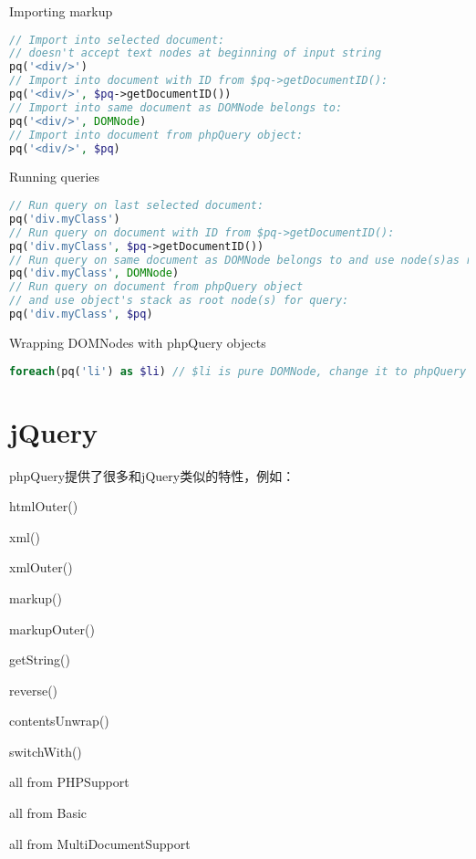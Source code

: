 \begin{compactenum}
\item Importing markup

\begin{lstlisting}[language=PHP]
// Import into selected document: 
// doesn't accept text nodes at beginning of input string 
pq('<div/>') 
// Import into document with ID from $pq->getDocumentID(): 
pq('<div/>', $pq->getDocumentID()) 
// Import into same document as DOMNode belongs to: 
pq('<div/>', DOMNode) 
// Import into document from phpQuery object: 
pq('<div/>', $pq)
\end{lstlisting}

\item Running queries

\begin{lstlisting}[language=PHP]
// Run query on last selected document: 
pq('div.myClass') 
// Run query on document with ID from $pq->getDocumentID(): 
pq('div.myClass', $pq->getDocumentID()) 
// Run query on same document as DOMNode belongs to and use node(s)as root for query: 
pq('div.myClass', DOMNode) 
// Run query on document from phpQuery object 
// and use object's stack as root node(s) for query: 
pq('div.myClass', $pq)
\end{lstlisting}

\item Wrapping DOMNodes with phpQuery objects

\begin{lstlisting}[language=PHP]
foreach(pq('li') as $li) // $li is pure DOMNode, change it to phpQuery object pq($li);
\end{lstlisting}

\end{compactenum}




\section{jQuery}


phpQuery提供了很多和jQuery类似的特性，例如：

\begin{compactitem}
\item htmlOuter() 
\item xml() 
\item xmlOuter() 
\item markup() 
\item markupOuter() 
\item getString() 
\item reverse() 
\item contentsUnwrap() 
\item switchWith() 
\item all from PHPSupport 
\item all from Basic 
\item all from MultiDocumentSupport
\end{compactitem}





